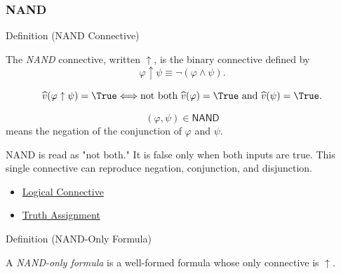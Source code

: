 \subsubsection*{NAND}

\begin{definitionbox}{Definition (NAND Connective)}
\begin{definition}
\label{def:nand-connective-propositional-logic}
The \emph{NAND} connective, written \(\uparrow\), is the binary connective
defined by
\[
\varphi\uparrow\psi\equiv\neg(\varphi\land\psi).
\]
\end{definition}
\end{definitionbox}

\begin{remark*}
\[
\widehat v(\varphi\uparrow\psi)=\True
\Longleftrightarrow
\text{not both }\widehat v(\varphi)=\True\text{ and }\widehat v(\psi)=\True.
\]
\end{remark*}

\begin{remark*}
\[
  (\varphi,\psi)\in\mathsf{NAND}
\] means the negation of the conjunction of
\(\varphi\) and \(\psi\).
\end{remark*}

\begin{remark*}[Interpretation]
NAND is read as "not both." It is false only when both inputs are true. This
single connective can reproduce negation, conjunction, and disjunction.
\end{remark*}

\begin{dependencies}
\begin{itemize}
  \item \hyperref[def:logical-connective]{Logical Connective}
  \item \hyperref[def:truth-assignment-propositional-logic]{Truth Assignment}
\end{itemize}
\end{dependencies}

\begin{definitionbox}{Definition (NAND-Only Formula)}
\begin{definition}
\label{def:nand-only-formula-propositional-logic}
A \emph{NAND-only formula} is a well-formed formula whose only connective is
\(\uparrow\).
\end{definition}
\end{definitionbox}

